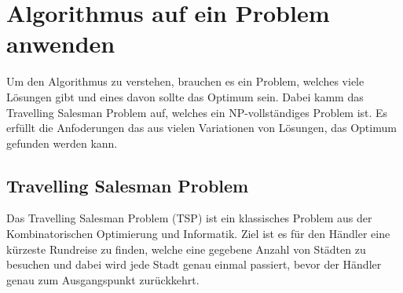 %
%
%
%
\section{Algorithmus auf ein Problem anwenden}
Um den Algorithmus zu verstehen, brauchen es ein Problem, 
welches viele Lösungen gibt und eines davon sollte das Optimum 
sein. Dabei kamm das Travelling Salesman Problem auf, welches ein
NP-vollständiges Problem ist. Es erfüllt die Anfoderungen das 
aus vielen Variationen von Lösungen, das Optimum gefunden werden 
kann.


\subsection{Travelling Salesman Problem}
Das Travelling Salesman Problem (TSP) ist ein klassisches Problem 
aus der Kombinatorischen Optimierung und Informatik. Ziel ist es 
für den Händler eine kürzeste Rundreise zu finden, welche eine 
gegebene Anzahl von Städten zu besuchen und dabei wird jede Stadt 
genau einmal passiert, bevor der Händler genau zum Ausgangspunkt 
zurückkehrt. 

